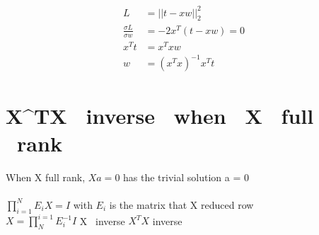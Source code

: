 \documentclass[12pt,letterpaper]{article}
\begin{document}
    \begin{align*}
        L &= ||t - xw||_2^2\\
        \frac{\sigma L}{\sigma w} &= -2x^T(t-xw) = 0\\
        x^Tt &= x^Txw\\
        w &= (x^Tx)^{-1}x^Tt
    \end{align*}
    
    \newpage
    \section{X^TX \ inverse \ when \ X \ full \ rank}
    When X full rank, \(Xa = 0\) has the trivial solution a = 0\\
    \rightarrow {}\\
    \rightarrow \(\prod_{i=1}^{N}E_i X = I\) \text with $E_i$ is the matrix that X reduced row\\
    \rightarrow $X = \prod_{N}^{i=1}E_i^{-1}I$ \rightarrow X \ inverse \rightarrow $X^TX$ inverse
\end{document}
